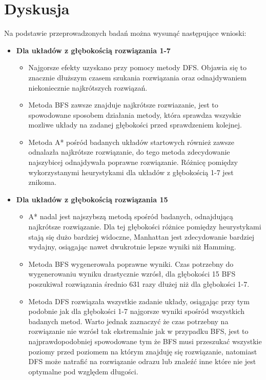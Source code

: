 \documentclass{classrep}
\begin{document}
    \section{Dyskusja}
    {

        Na podstawie przeprowadzonych badań można wysunąć następujące wnioski:
         \begin{itemize}
         \setlength\itemsep{1em}
            \item {\textbf{Dla układów z głębokością rozwiązania 1-7}}
                \begin{itemize}

                    \item{Najgorsze efekty uzyskano przy pomocy metody DFS.
            Objawia się to znacznie dłuższym czasem szukania rozwiązania oraz odnajdywaniem niekoniecznie najkrótszych rozwiązań.}

                    \item{ Metoda BFS zawsze znajduje najkrótsze rozwiazanie, jest to spowodowane sposobem działania metody, która sprawdza wszyskie mozliwe układy na zadanej głębokości przed sprawdzeniem kolejnej.}

                    \item{Metoda A* pośród badanych układów startowych również zawsze odnalazła najkrótsze rozwiązanie, do tego metoda zdecydowanie najszybicej odnajdywała poprawne rozwiązanie.
            Różnicę pomiędzy wykorzystanymi heurystykami dla układów z głębokością 1-7 jest znikoma.}
                \end{itemize}
            \item {\textbf{Dla układów z głębokością rozwiązania 15}}
                 \begin{itemize}

                    \item { A* nadal jest najszybszą metodą spośród badanych, odnajdującą najkrótsze rozwiązanie. Dla tej głębokości różnice pomiędzy heurystykami stają się dużo bardziej widoczne, Manhattan jest zdecydowanie bardziej wydajny, osiągając nawet dwukrotnie lepsze wyniki niż Hamming.}

                    \item{Metoda BFS wygenerowała poprawne wyniki. Czas potrzebny do wygenerowaniu wyniku drastycznie wzrósł, dla głębokości 15 BFS poszukiwał rozwiązania średnio 631 razy dłużej niż dla głębokości 1-7.}

                    \item{Metoda DFS rozwiązała wszystkie zadanie układy, osiągając przy tym podobnie jak dla głębokości 1-7 najgorsze wyniki spośród
                    wszystkich badanych metod. Warto jednak zaznaczyć że czas potrzebny na rozwiązanie nie wzrósł tak ekstremalnie jak w przypadku BFS, jest to najprawdopodobniej spowodowane tym że BFS musi przeszukać wszystkie poziomy przed poziomem na którym znajduję się rozwiązanie, natomiast DFS  może natrafić na rozwiązanie odrazu lub znaleźć inne które nie jest optymalne pod względem długości. }


\end{itemize}
\end{itemize}}
\end{document}
